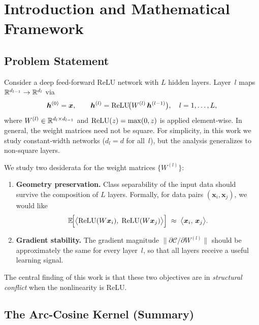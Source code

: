 \chapter{Introduction and Mathematical Framework}
\label{ch:framework}

\section{Problem Statement}

Consider a deep feed-forward ReLU network with $L$ hidden layers.
Layer~$l$ maps $\mathbb{R}^{d_{l-1}} \to \mathbb{R}^{d_l}$ via
\begin{equation}\label{eq:forward}
  \bm{h}^{(0)} = \bm{x}, \qquad
  \bm{h}^{(l)} = \operatorname{ReLU}\!\bigl(W^{(l)}\,\bm{h}^{(l-1)}\bigr),
  \quad l = 1,\dots,L,
\end{equation}
where $W^{(l)} \in \mathbb{R}^{d_l \times d_{l-1}}$ and
$\operatorname{ReLU}(z) = \max(0,z)$ is applied element-wise.
In general, the weight matrices need not be square.
For simplicity, in this work we study constant-width networks
($d_l = d$ for all~$l$), but the analysis generalizes to
non-square layers.

We study two desiderata for the weight matrices $\{W^{(l)}\}$:
\begin{enumerate}[label=(\roman*)]
  \item \textbf{Geometry preservation.}  Class separability of the input
        data should survive the composition of $L$ layers.  Formally,
        for data pairs $(\bm{x}_i, \bm{x}_j)$, we would like
        \[
          \mathbb{E}\!\Bigl[
            \bigl\langle \operatorname{ReLU}(W\bm{x}_i),\; \operatorname{ReLU}(W\bm{x}_j) \bigr\rangle
          \Bigr]
          \;\approx\;
          \bigl\langle \bm{x}_i,\, \bm{x}_j \bigr\rangle.
        \]
  \item \textbf{Gradient stability.}  The gradient magnitude
        $\|\partial \mathcal{C}/\partial W^{(l)}\|$ should be approximately
        the same for every layer~$l$, so that all layers receive a useful
        learning signal.
\end{enumerate}

\noindent
The central finding of this work is that these two objectives are in
\emph{structural conflict} when the nonlinearity is ReLU.

\section{The Arc-Cosine Kernel (Summary)}
\label{sec:kernel}

